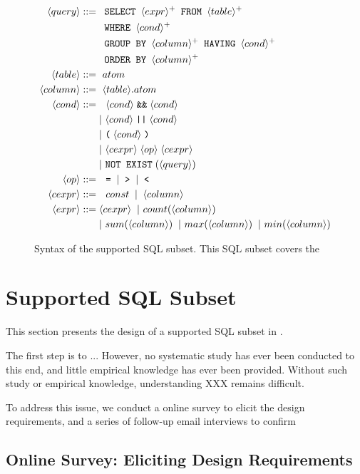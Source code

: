 \begin{figure}[t]
\footnotesize%
\begin{align*}
\langle query\rangle ::= {} 
	& \texttt{ SELECT } \langle expr\rangle^+ \texttt{ FROM } \langle table\rangle^+ \\
        & \texttt{ WHERE } \langle cond\rangle^+ \\ 
	&  \texttt{ GROUP BY } \langle column\rangle^+ \texttt{ HAVING } \langle cond\rangle^+\\
	&  \texttt{ ORDER BY } \langle column\rangle^+ \\
\langle table\rangle::= {} &\ atom \\
\langle column\rangle ::= {} &\ \langle table\rangle.atom\\
\langle cond\rangle ::= {} &\ \ \langle cond\rangle \;\texttt{\&\&}\; \langle cond\rangle \\ 
    & |\ \langle cond\rangle \;\texttt{||}\; \langle cond\rangle \\
    & |\ \texttt{(}\;\langle cond\rangle\;\texttt{)} \\
    & |\ \langle cexpr\rangle \;\langle op\rangle\; \langle cexpr\rangle \\
    & |\ \texttt{NOT EXIST} \;(\langle query\rangle) \\
\langle op\rangle ::= {} &\ \ \texttt{=} \;\;|\;\; \texttt{>}  \;\;|\;\; \texttt{<}\\
\langle cexpr\rangle ::= {} &\ \ const \;\;|\;\; \langle column\rangle  \;\; \\
\langle expr\rangle ::= {} & \langle cexpr\rangle \;\;|\ count(\langle column\rangle) \\
    & |\ sum(\langle column\rangle) \;\;|\ max(\langle column\rangle) \;\;|\ min(\langle column\rangle) 
\end{align*}
\normalsize%
\caption{Syntax of the supported SQL subset. This SQL subset
covers the }
\label{fig:syntax}
\end{figure}


\section{Supported SQL Subset}
\label{sec:langsubset}

This section presents the design of
a supported SQL subset in \ourtool.

The first step is to ... \todo{}
However, no systematic study has ever been conducted to this end, 
and little empirical knowledge has ever been provided. Without 
such study or empirical knowledge, understanding XXX
 remains difficult.

To address this issue, we conduct a online survey to elicit
the design requirements, and a series of follow-up email interviews
to confirm 

\subsection{Online Survey: Eliciting Design Requirements}

